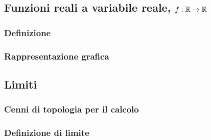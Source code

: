 \documentclass[letterpaper,10pt,italian]{jupyterBook}
\begin{document}
\subsection{Funzioni reali a variabile reale, \protect\(f: \mathbb{R} \rightarrow \mathbb{R}\protect\)}
\label{\detokenize{ch/infinitesimal_calculus/analysis:funzioni-reali-a-variabile-reale-f-mathbb-r-rightarrow-mathbb-r}}\label{\detokenize{ch/infinitesimal_calculus/analysis:infinitesimal-calculus-analysis-real-functions}}

\subsubsection{Definizione}
\label{\detokenize{ch/infinitesimal_calculus/analysis:definizione}}\label{\detokenize{ch/infinitesimal_calculus/analysis:infinitesimal-calculus-analysis-real-functions-def}}

\subsubsection{Rappresentazione grafica}
\label{\detokenize{ch/infinitesimal_calculus/analysis:rappresentazione-grafica}}\label{\detokenize{ch/infinitesimal_calculus/analysis:infinitesimal-calculus-analysis-real-functions-graph}}



\subsection{Limiti}
\label{\detokenize{ch/infinitesimal_calculus/analysis:limiti}}\label{\detokenize{ch/infinitesimal_calculus/analysis:infinitesimal-calculus-limits}}

\subsubsection{Cenni di topologia per il calcolo}
\label{\detokenize{ch/infinitesimal_calculus/analysis:cenni-di-topologia-per-il-calcolo}}
\sphinxAtStartPar
{} 


\subsubsection{Definizione di limite}
\label{\detokenize{ch/infinitesimal_calculus/analysis:definizione-di-limite}}\label{\detokenize{ch/infinitesimal_calculus/analysis:infinitesimal-calculus-limits-def}}
\end{document}

